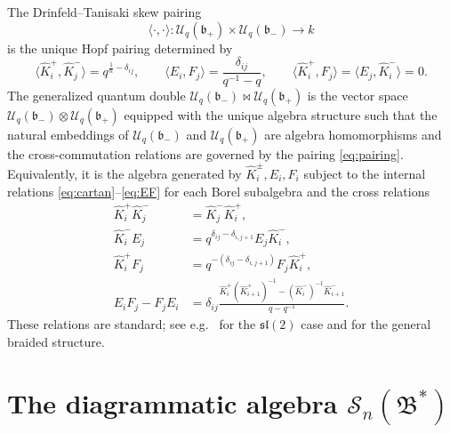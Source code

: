 \documentclass{article}
\theoremstyle{definition}
\newcommand{\Uc}{\mathcal{U}}
\newcommand{\bcS}{\mathcal{S}}
\newcommand{\fB}{\mathfrak{B}}
\newcommand{\fb}{\mathfrak{b}}
\newcommand{\sl}{\mathfrak{sl}}
\newcommand{\bipr}{\bowtie}
\newcommand{\la}{\langle}
\newcommand{\ra}{\rangle}
\begin{document}
The Drinfeld--Tanisaki skew pairing
\[
\la\cdot,\cdot\ra:\Uc_q(\fb_+)\times\Uc_q(\fb_-)\longrightarrow k
\]
is the unique Hopf pairing determined by
\begin{equation}\label{eq:pairing}
\la \hat K_i^+,\hat K_j^-\ra = q^{\frac1n-\delta_{ij}},\qquad
\la E_i,F_j\ra = \frac{\delta_{ij}}{q^{-1}-q},\qquad
\la \hat K_i^+,F_j\ra=\la E_j,\hat K_i^-\ra=0.
\end{equation}
The generalized quantum double $\Uc_q(\fb_-)\bipr \Uc_q(\fb_+)$ is the vector space $\Uc_q(\fb_-)\otimes \Uc_q(\fb_+)$ equipped with the unique algebra structure such that the natural embeddings of $\Uc_q(\fb_-)$ and $\Uc_q(\fb_+)$ are algebra homomorphisms and the cross-commutation relations are governed by the pairing \eqref{eq:pairing}. Equivalently, it is the algebra generated by $\hat K_i^\pm,E_i,F_i$ subject to the internal relations \eqref{eq:cartan}--\eqref{eq:EF} for each Borel subalgebra and the cross relations
\begin{equation}\label{eq:cross}
\begin{aligned}
\hat K_i^+\hat K_j^-&=\hat K_j^-\hat K_i^+,\\
\hat K_i^- E_j &= q^{\delta_{ij}-\delta_{i,j+1}} E_j \hat K_i^-,\\
\hat K_i^+ F_j &= q^{-(\delta_{ij}-\delta_{i,j+1})} F_j \hat K_i^+,\\
E_i F_j - F_j E_i &= \delta_{ij}\frac{\hat K_i^+(\hat K_{i+1}^+)^{-1} - (\hat K_i^-)^{-1}\hat K_{i+1}^-}{q-q^{-1}}.
\end{aligned}
\end{equation}
These relations are standard; see e.g.\ \cite[Proposition~2.10]{StokmanDouble} for the $\sl(2)$ case and \cite[Theorem~1.7]{StokmanDouble} for the general braided structure.

\section{The diagrammatic algebra $\bcS_n(\fB^*)$}
\end{document}
